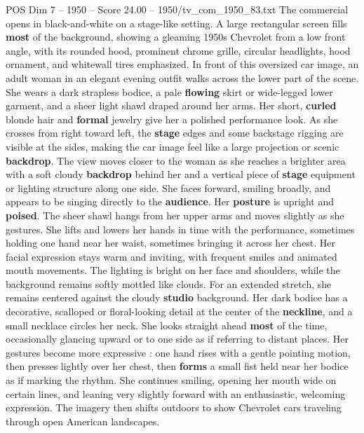 \begin{textsample}{POS Dim 7 – 1950 – Score 24.00 – 1950/tv\_com\_1950\_83.txt}  \label{ex:f7_pos_003}
The commercial opens in black-and-white on a stage-like setting.
A large rectangular screen fills \textbf{most} of the background, showing a gleaming 1950s Chevrolet from a low front angle, with its rounded hood, prominent chrome grille, circular headlights, hood ornament, and whitewall tires emphasized.
In front of this oversized car image, an adult woman in an elegant evening outfit walks across the lower part of the scene.
She wears a dark strapless bodice, a pale \textbf{flowing} skirt or wide-legged lower garment, and a sheer light shawl draped around her arms.
Her short, \textbf{curled} blonde hair and \textbf{formal} jewelry give her a polished performance look.
As she crosses from right toward left, the \textbf{stage} edges and some backstage rigging are visible at the sides, making the car image feel like a large projection or scenic \textbf{backdrop}.
The view moves closer to the woman as she reaches a brighter area with a soft cloudy \textbf{backdrop} behind her and a vertical piece of \textbf{stage} equipment or lighting structure along one side.
She faces forward, smiling broadly, and appears to be singing directly to the \textbf{audience}.
Her \textbf{posture} is upright and \textbf{poised}.
The sheer shawl hangs from her upper arms and moves slightly as she gestures.
She lifts and lowers her hands in time with the performance, sometimes holding one hand near her waist, sometimes bringing it across her chest.
Her facial expression stays warm and inviting, with frequent smiles and animated mouth movements.
The lighting is bright on her face and shoulders, while the background remains softly mottled like clouds.
For an extended stretch, she remains centered against the cloudy \textbf{studio} background.
Her dark bodice has a decorative, scalloped or floral-looking detail at the center of the \textbf{neckline}, and a small necklace circles her neck.
She looks straight ahead \textbf{most} of the time, occasionally glancing upward or to one side as if referring to distant places.
Her gestures become more expressive : one hand rises with a gentle pointing motion, then presses lightly over her chest, then \textbf{forms} a small fist held near her bodice as if marking the rhythm.
She continues smiling, opening her mouth wide on certain lines, and leaning very slightly forward with an enthusiastic, welcoming expression.
The imagery then shifts outdoors to show Chevrolet cars traveling through open American landscapes.

\end{textsample}
